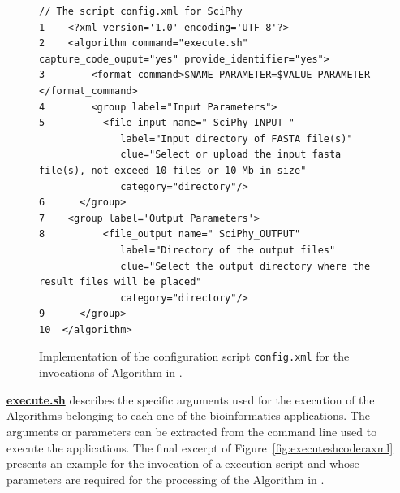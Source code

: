  \begin{figure}[!t]
 \begin{lstlisting}[style=myScalastyle]
 // The script config.xml for SciPhy
1    <?xml version='1.0' encoding='UTF-8'?>
2    <algorithm command="execute.sh" capture_code_ouput="yes" provide_identifier="yes">
3        <format_command>$NAME_PARAMETER=$VALUE_PARAMETER </format_command>
4        <group label="Input Parameters">
5          <file_input name=" SciPhy_INPUT "
              label="Input directory of FASTA file(s)"
              clue="Select or upload the input fasta file(s), not exceed 10 files or 10 Mb in size"
              category="directory"/>
6      </group>
7    <group label='Output Parameters'>
8          <file_output name=" SciPhy_OUTPUT" 
              label="Directory of the output files" 
              clue="Select the output directory where the result files will be placed" 
              category="directory"/>
9      </group>
10  </algorithm>

\end{lstlisting}
\vspace{-10px}
\caption{Implementation of the configuration script \texttt{config.xml} for the invocations of Algorithm \sci in \system.}
\label{fig:configxmlcodesciphy}
\end{figure}

\underline{\textbf{execute.sh}} describes the specific arguments used for the execution of the Algorithms belonging to each one of the bioinformatics applications. The arguments or parameters can be extracted from the command line used to execute the applications. The final excerpt of Figure~\ref{fig:executeshcoderaxml} presents an example for the invocation of a execution script and whose parameters are required for the processing of the Algorithm \raxml in \system. 

